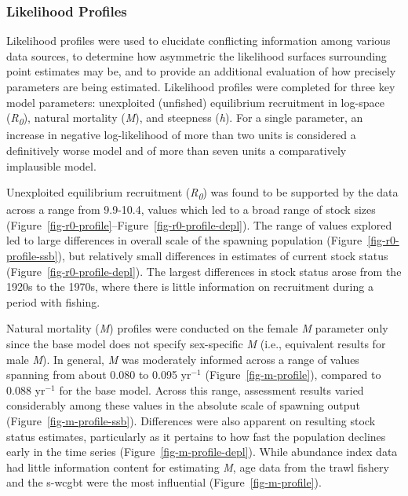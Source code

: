\documentclass[
  english,
]{article}
\begin{document}
\subsubsection{Likelihood Profiles}\label{profiles}

Likelihood profiles were used to elucidate conflicting information among
various data sources, to determine how asymmetric the likelihood
surfaces surrounding point estimates may be, and to provide an
additional evaluation of how precisely parameters are being estimated.
Likelihood profiles were completed for three key model parameters:
unexploited (unfished) equilibrium recruitment in log-space
(\emph{R\textsubscript{0}}), natural mortality (\emph{M}), and steepness
(\emph{h}). For a single parameter, an increase in negative
log-likelihood of more than two units is considered a definitively worse
model and of more than seven units a comparatively implausible model.

Unexploited equilibrium recruitment (\emph{R\textsubscript{0}}) was
found to be supported by the data across a range from 9.9-10.4, values
which led to a broad range of stock sizes
(Figure~\ref{fig-r0-profile}--Figure~\ref{fig-r0-profile-depl}). The
range of values explored led to large differences in overall scale of
the spawning population (Figure~\ref{fig-r0-profile-ssb}), but
relatively small differences in estimates of current stock status
(Figure~\ref{fig-r0-profile-depl}). The largest differences in stock
status arose from the 1920s to the 1970s, where there is little
information on recruitment during a period with fishing.

Natural mortality (\emph{M}) profiles were conducted on the female
\emph{M} parameter only since the base model does not specify
sex-specific \emph{M} (i.e., equivalent results for male \emph{M}). In
general, \emph{M} was moderately informed across a range of values
spanning from about 0.080 to 0.095 yr\(^{-1}\)
(Figure~\ref{fig-m-profile}), compared to 0.088 yr\(^{-1}\) for the base
model. Across this range, assessment results varied considerably among
these values in the absolute scale of spawning output
(Figure~\ref{fig-m-profile-ssb}). Differences were also apparent on
resulting stock status estimates, particularly as it pertains to how
fast the population declines early in the time series
(Figure~\ref{fig-m-profile-depl}). While abundance index data had little
information content for estimating \emph{M}, age data from the trawl
fishery and the \gls{s-wcgbt} were the most influential
(Figure~\ref{fig-m-profile}).
\end{document}
